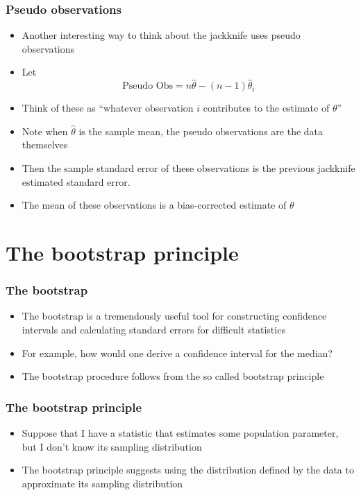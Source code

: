 \documentclass[aspectratio=169]{beamer}
\begin{document}
\begin{frame}\frametitle{Pseudo observations}
  \begin{itemize}
    \item Another interesting way to think about the jackknife uses pseudo observations
    \item Let
      $$
      \mbox{Pseudo Obs} = n \hat \theta - (n - 1) \hat \theta_{i}
      $$
    \item Think of these as ``whatever observation $i$ contributes to the estimate of $\theta$''
    \item Note when $\hat \theta$ is the sample mean, the pseudo observations are the data themselves
    \item Then the sample standard error of these observations is the previous jackknife estimated standard error.
    \item The mean of these observations is a bias-corrected estimate of $\theta$
  \end{itemize}
\end{frame}

\section{The bootstrap principle}
\begin{frame}\frametitle{The bootstrap}
\begin{itemize}
\item The bootstrap is a tremendously useful tool for constructing
  confidence intervals and calculating standard errors for difficult
  statistics
\item For example, how would one derive a confidence interval for
  the median?
\item The bootstrap procedure follows from the so called bootstrap
  principle
\end{itemize}
\end{frame}

\begin{frame}\frametitle{The bootstrap principle}
\begin{itemize}
\item Suppose that I have a statistic that estimates some population
  parameter, but I don't know its sampling distribution
\item The bootstrap principle suggests using the distribution defined
  by the data to approximate its sampling distribution
\end{itemize}
\end{frame}
\end{document}
